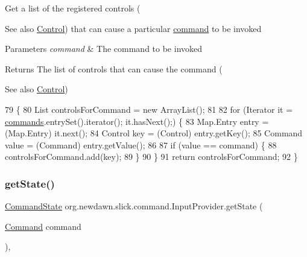 Get a list of the registered controls (\begin{DoxySeeAlso}{See also}
\mbox{\hyperlink{interfaceorg_1_1newdawn_1_1slick_1_1command_1_1_control}{Control}}) that can cause a particular \mbox{\hyperlink{namespaceorg_1_1newdawn_1_1slick_1_1command}{command}} to be invoked
\end{DoxySeeAlso}

\begin{DoxyParams}{Parameters}
{\em command} & The command to be invoked \\
\hline
\end{DoxyParams}
\begin{DoxyReturn}{Returns}
The list of controls that can cause the command (
\end{DoxyReturn}
\begin{DoxySeeAlso}{See also}
\mbox{\hyperlink{interfaceorg_1_1newdawn_1_1slick_1_1command_1_1_control}{Control}}) 
\end{DoxySeeAlso}

\begin{DoxyCode}
79                                                 \{
80         List controlsForCommand = \textcolor{keyword}{new} ArrayList();
81 
82         \textcolor{keywordflow}{for} (Iterator it = \mbox{\hyperlink{classorg_1_1newdawn_1_1slick_1_1command_1_1_input_provider_ab2bd0c08506a59bc7457d7a87cf873d2}{commands}}.entrySet().iterator(); it.hasNext();) \{
83             Map.Entry entry = (Map.Entry) it.next();
84             Control key = (Control) entry.getKey();
85             Command value = (Command) entry.getValue();
86 
87             \textcolor{keywordflow}{if} (value == command) \{
88                 controlsForCommand.add(key);
89             \}
90         \}
91         \textcolor{keywordflow}{return} controlsForCommand;
92     \}
\end{DoxyCode}
\mbox{\label{classorg_1_1newdawn_1_1slick_1_1command_1_1_input_provider_aa25975d0cc21a4d1a45995c553e72357}} 
\subsubsection{\texorpdfstring{get\+State()}{getState()}}
{\footnotesize\ttfamily \mbox{\hyperlink{classorg_1_1newdawn_1_1slick_1_1command_1_1_input_provider_1_1_command_state}{Command\+State}} org.\+newdawn.\+slick.\+command.\+Input\+Provider.\+get\+State (\begin{DoxyParamCaption}\item[{\mbox{\hyperlink{interfaceorg_1_1newdawn_1_1slick_1_1command_1_1_command}{Command}}}]{command }\end{DoxyParamCaption})\hspace{0.3cm}{\ttfamily [inline]}, {\ttfamily [private]}}

